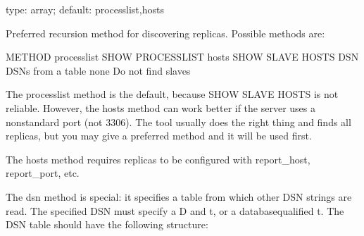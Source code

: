 \documentclass[letterpaper,10pt,english]{sphinxmanual}
\begin{document}

\begin{fulllineitems}
\label{\detokenize{mariadb-schema-change:cmdoption-mariadb-schema-change-recursion-method}}
type: array; default: processlist,hosts

Preferred recursion method for discovering replicas.  Possible methods are:

\begin{sphinxVerbatim}[commandchars=\\\{\}]
METHOD       
  
processlist  SHOW PROCESSLIST
hosts        SHOW SLAVE HOSTS
DSN      DSNs from a table
none         Do not find slaves
\end{sphinxVerbatim}

The processlist method is the default, because SHOW SLAVE HOSTS is not
reliable.  However, the hosts method can work better if the server uses a
non\sphinxhyphen{}standard port (not 3306).  The tool usually does the right thing and
finds all replicas, but you may give a preferred method and it will be used
first.

The hosts method requires replicas to be configured with report\_host,
report\_port, etc.

The dsn method is special: it specifies a table from which other DSN strings
are read.  The specified DSN must specify a D and t, or a database\sphinxhyphen{}qualified
t.  The DSN table should have the following structure:


\end{fulllineitems}
\end{document}
